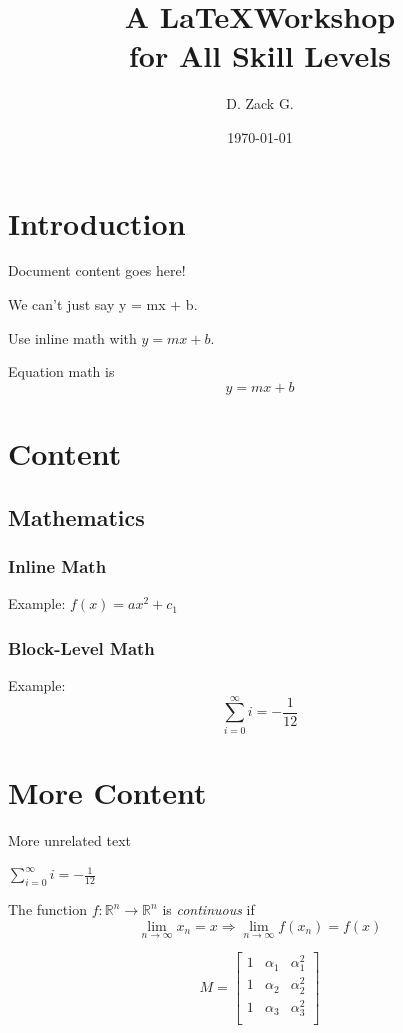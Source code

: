 \documentclass{article}
\title{A \LaTeX Workshop \\ for All Skill Levels}
\author{D. Zack G.}
\date{\today}
\newcommand{\RR}[1]{\mathbb{R}^{#1}}
\begin{document}
\maketitle
\newpage
\tableofcontents
\newpage

\section{Introduction}
    Document content goes here!
    
    We can't just say y = mx + b.
    
    Use inline math with $y = mx + b$.
    
    Equation math is $$y = mx + b$$

\section{Content}
	\subsection{Mathematics}
        \subsubsection{Inline Math}
        	Example: $f(x)=ax^2 + c_1$
        \subsubsection{Block-Level Math}
        	Example: $$ \sum_{i=0}^\infty i = -\frac{1}{12} $$
        	
\section{More Content}
    More unrelated text
		
    $\sum_{i=0}^\infty i = -\frac{1}{12}$
    
    The function $f: \RR{n} \rightarrow \RR{n}$ is \textit{continuous} if
    $$\lim_{n\rightarrow\infty} x_n = x \Rightarrow \lim_{n\rightarrow\infty} f(x_n) = f(x)$$
    
$$
M=
  \left[ {
      \begin{array}{ccc}
       1 & \alpha_1 & \alpha_1^2 \\
       1 & \alpha_2 & \alpha_2^2 \\
       1 & \alpha_3 & \alpha_3^2 \\
      \end{array}
  } \right]
$$
    
\end{document}
